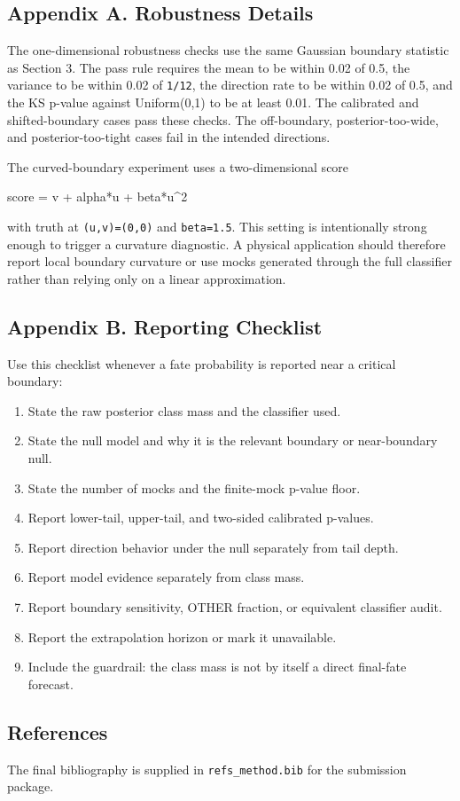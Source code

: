 \documentclass[
]{article}
\newenvironment{Shaded}{}{}
\newcommand{\NormalTok}[1]{#1}
\providecommand{\tightlist}{%
  \setlength{\itemsep}{0pt}\setlength{\parskip}{0pt}}
\begin{document}
\subsection{Appendix A. Robustness
Details}\label{appendix-a.-robustness-details}

The one-dimensional robustness checks use the same Gaussian boundary
statistic as Section 3. The pass rule requires the mean to be within
0.02 of 0.5, the variance to be within 0.02 of \texttt{1/12}, the
direction rate to be within 0.02 of 0.5, and the KS p-value against
Uniform(0,1) to be at least 0.01. The calibrated and shifted-boundary
cases pass these checks. The off-boundary, posterior-too-wide, and
posterior-too-tight cases fail in the intended directions.

The curved-boundary experiment uses a two-dimensional score

\begin{Shaded}
\begin{Highlighting}[]
\NormalTok{score = v + alpha*u + beta*u\^{}2}
\end{Highlighting}
\end{Shaded}

with truth at \texttt{(u,v)=(0,0)} and \texttt{beta=1.5}. This setting
is intentionally strong enough to trigger a curvature diagnostic. A
physical application should therefore report local boundary curvature or
use mocks generated through the full classifier rather than relying only
on a linear approximation.

\subsection{Appendix B. Reporting
Checklist}\label{appendix-b.-reporting-checklist}

Use this checklist whenever a fate probability is reported near a
critical boundary:

\begin{enumerate}
\def\labelenumi{\arabic{enumi}.}
\tightlist
\item
  State the raw posterior class mass and the classifier used.
\item
  State the null model and why it is the relevant boundary or
  near-boundary null.
\item
  State the number of mocks and the finite-mock p-value floor.
\item
  Report lower-tail, upper-tail, and two-sided calibrated p-values.
\item
  Report direction behavior under the null separately from tail depth.
\item
  Report model evidence separately from class mass.
\item
  Report boundary sensitivity, OTHER fraction, or equivalent classifier
  audit.
\item
  Report the extrapolation horizon or mark it unavailable.
\item
  Include the guardrail: the class mass is not by itself a direct
  final-fate forecast.
\end{enumerate}

\subsection{References}\label{references}

The final bibliography is supplied in \texttt{refs\_method.bib} for the
submission package.


\end{document}
